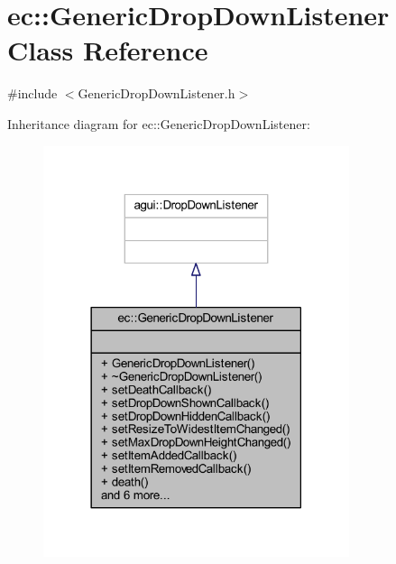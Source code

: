 \hypertarget{classec_1_1_generic_drop_down_listener}{}\section{ec\+:\+:Generic\+Drop\+Down\+Listener Class Reference}
\label{classec_1_1_generic_drop_down_listener}


{\ttfamily \#include $<$Generic\+Drop\+Down\+Listener.\+h$>$}



Inheritance diagram for ec\+:\+:Generic\+Drop\+Down\+Listener\+:\nopagebreak
\begin{figure}[H]
\begin{center}
\leavevmode
\includegraphics[width=254pt]{classec_1_1_generic_drop_down_listener__inherit__graph}
\end{center}
\end{figure}


